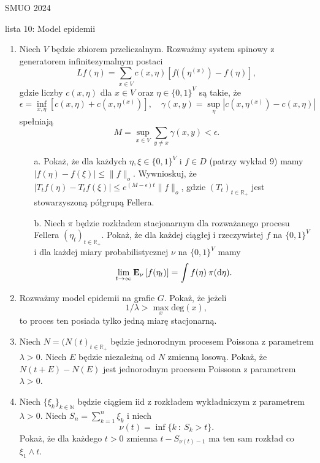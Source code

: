 \documentclass{article}
\begin{document}
SMUO 2024

lista 10: Model epidemii

\begin{enumerate}
	\item Niech $V$ będzie zbiorem przeliczalnym. Rozważmy system spinowy z generatorem 
		infinitezymalnym postaci
		\begin{equation*}
			Lf(\eta) = 
			\sum_{x \in V} 
			c(x, \eta) \left[ f(\left(\eta^{(x)} \right) - f(\eta) \right],
		\end{equation*}
		gdzie liczby $c(x, \eta)$ dla $x\in V$ oraz $\eta\in \{0,1\}^V$ są takie, że
		\begin{equation*}
			\epsilon = \inf_{x,\eta}\left[c(x,\eta) +c\left(x, \eta^{(x)}\right) \right], 
			\quad
			\gamma(x,y) = \sup_{\eta} \left|c\left(x,\eta^{(x)}\right) -c(x,\eta) \right|
		\end{equation*}
		spełniają
		\begin{equation*}
			M = \sup_{x \in V} \sum_{y \neq x} \gamma(x,y) <\epsilon.
		\end{equation*}
		\begin{itemize}
			\item[a.] Pokaż, że dla każdych $\eta, \xi \in \{ 0,1\}^V$
				i $f \in D$ (patrzy wykład 9) mamy
				$|f(\eta) - f(\xi)| \leq \|f\|_o$. Wywnioskuj, że
				$|T_tf(\eta) - T_tf(\xi)| \leq e^{(M-\epsilon)t}\|f\|_o$,
				gdzie $(T_t)_{t \in \mathbb{R}_+}$ jest stowarzyszoną
				półgrupą Fellera.
			\item[b.] Niech $\pi$ będzie rozkładem stacjonarnym dla rozważanego 
				procesu Fellera $(\eta_t)_{t \in \mathbb{R}_+}$. Pokaż,
				że dla każdej ciągłej i rzeczywistej $f$ na $\{0,1\}^V$
				i dla każdej miary probabilistycznej $\nu$ na $\{0,1\}^V$
				mamy
				\begin{equation*}
					\lim_{t \to \infty} \mathbf{E}_\nu \left[f(\eta_t) \right]
					= \int f(\eta) \: \pi(\mathrm{d}\eta).
				\end{equation*}
		\end{itemize}
	\item Rozważmy model epidemii na grafie $G$. Pokaż, że jeżeli
		\begin{equation*}
			1/\lambda > \max_{x} \mathrm{deg}(x),
		\end{equation*}
		to proces ten posiada tylko jedną miarę stacjonarną.
	\item Niech $N=(N(t)_{t \in \mathbb{R}_+}$ będzie jednorodnym procesem Poissona z parametrem 
		$\lambda>0$. Niech $E$ będzie niezależną od $N$ zmienną losową. Pokaż, że
		$N(t+E)-N(E)$ jest jednorodnym procesem Poissona z parametrem $\lambda>0$.

	\item Niech $\{\xi_k\}_{k \in \mathbb{N}}$ będzie ciągiem iid z rozkładem wykładniczym z 
		parametrem $\lambda>0$. Niech $S_n = \sum_{k=1}^n\xi_k$ i niech
		\begin{equation*}
			\nu(t) = \inf \{ k \: : \: S_k>t\}.
		\end{equation*}
		Pokaż, że dla każdego $t>0$ zmienna $t-S_{\nu(t)-1}$ ma ten sam rozkład co 
		$\xi_1\wedge t$.

\end{enumerate}
\end{document}
